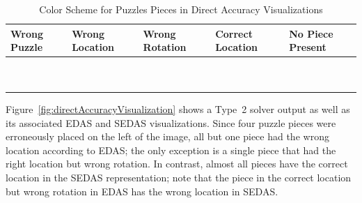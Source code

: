 \begin{table}[tb]
	\begin{center}
  		\begin{tabular}{ | >{\centering\arraybackslash}m{0.9in} | >{\centering\arraybackslash}m{0.9in} | >{\centering\arraybackslash}m{0.9in} | >{\centering\arraybackslash}m{0.9in} | >{\centering\arraybackslash}m{0.9in} | }
 \hline
    		Wrong Puzzle & Wrong Location & Wrong Rotation & Correct Location  & No Piece Present  \\ \hline
			{\cellcolor{blue}~} & {\cellcolor{red}~}  & {\cellcolor{orange}~}  & {\cellcolor{green}~} & {\cellcolor{black}~}  \\
			{\cellcolor{blue}~} & {\cellcolor{red}~}  & {\cellcolor{orange}~}  & {\cellcolor{green}~} & {\cellcolor{black}~} \\
 \hline
		\end{tabular}
	\end{center}
\caption{Color Scheme for Puzzles Pieces in Direct Accuracy Visualizations}\label{tab:directAccuracyColors}
\end{table}

Figure~\ref{fig:directAccuracyVisualization} shows a Type~2 solver output as well as its associated EDAS and SEDAS visualizations. Since four puzzle pieces were erroneously placed on the left of the image, all but one piece had the wrong location according to EDAS; the only exception is a single piece that had the right location but wrong rotation.  In contrast, almost all pieces have the correct location in the SEDAS representation; note that the piece in the correct location but wrong rotation in EDAS has the wrong location in SEDAS.

